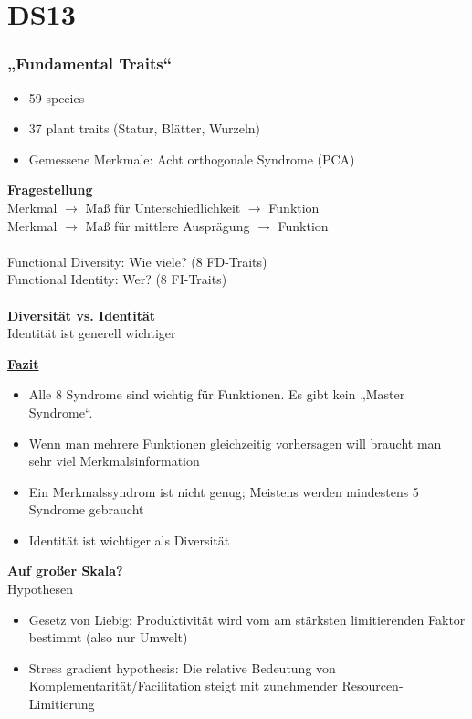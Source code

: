\section{DS13}
\subsubsection{„Fundamental Traits“}
\begin{itemize}
	\item 59 species
	\item 37 plant traits (Statur, Blätter, Wurzeln)
	\item Gemessene Merkmale: Acht orthogonale Syndrome (PCA)
\end{itemize}

\textbf{Fragestellung}\\
Merkmal $\rightarrow$ Maß für Unterschiedlichkeit $\rightarrow$ Funktion\\
Merkmal $\rightarrow$ Maß für mittlere Ausprägung $\rightarrow$ Funktion\\
\\
Functional Diversity: Wie viele? (8 FD-Traits)\\
Functional Identity: Wer? (8 FI-Traits)\\
\\
\textbf{Diversität vs. Identität}\\
Identität ist generell wichtiger

\underline{\textbf{Fazit}}
\begin{itemize}
	\item Alle 8 Syndrome sind wichtig für Funktionen. Es gibt kein „Master Syndrome“.
	\item Wenn man mehrere Funktionen gleichzeitig vorhersagen will braucht man sehr viel Merkmalsinformation
	\item Ein Merkmalssyndrom ist nicht genug; Meistens werden mindestens 5 Syndrome gebraucht
	\item Identität ist wichtiger als Diversität
\end{itemize}

\textbf{Auf großer Skala?}\\
Hypothesen
\begin{itemize}
	\item Gesetz von Liebig: Produktivität wird vom am stärksten limitierenden Faktor bestimmt (also nur Umwelt)
	\item Stress gradient hypothesis: Die relative Bedeutung von Komplementarität/Facilitation steigt mit zunehmender Resourcen-Limitierung
\end{itemize}

